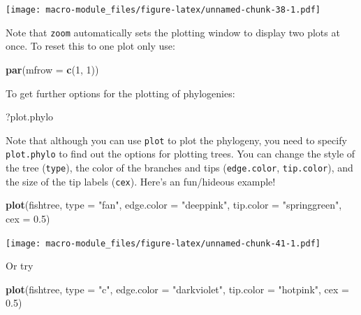 \documentclass[]{book}
\newenvironment{Shaded}{\begin{snugshade}}{\end{snugshade}}
\newcommand{\KeywordTok}[1]{\textcolor[rgb]{0.13,0.29,0.53}{\textbf{{#1}}}}
\newcommand{\DataTypeTok}[1]{\textcolor[rgb]{0.13,0.29,0.53}{{#1}}}
\newcommand{\DecValTok}[1]{\textcolor[rgb]{0.00,0.00,0.81}{{#1}}}
\newcommand{\FloatTok}[1]{\textcolor[rgb]{0.00,0.00,0.81}{{#1}}}
\newcommand{\StringTok}[1]{\textcolor[rgb]{0.31,0.60,0.02}{{#1}}}
\newcommand{\NormalTok}[1]{{#1}}
\theoremstyle{definition}
\theoremstyle{definition}
\theoremstyle{definition}
\theoremstyle{remark}
\begin{document}
\texttt{[image: macro-module\_files/figure-latex/unnamed-chunk-38-1.pdf]}

Note that \texttt{zoom} automatically sets the plotting window to
display two plots at once. To reset this to one plot only use:

\begin{Shaded}
\begin{Highlighting}[]
\KeywordTok{par}\NormalTok{(}\DataTypeTok{mfrow =} \KeywordTok{c}\NormalTok{(}\DecValTok{1}\NormalTok{, }\DecValTok{1}\NormalTok{))}
\end{Highlighting}
\end{Shaded}

To get further options for the plotting of phylogenies:

\begin{Shaded}
\begin{Highlighting}[]
\NormalTok{?plot.phylo}
\end{Highlighting}
\end{Shaded}

Note that although you can use \texttt{plot} to plot the phylogeny, you
need to specify \texttt{plot.phylo} to find out the options for plotting
trees. You can change the style of the tree (\texttt{type}), the color
of the branches and tips (\texttt{edge.color}, \texttt{tip.color}), and
the size of the tip labels (\texttt{cex}). Here's an fun/hideous
example!

\begin{Shaded}
\begin{Highlighting}[]
\KeywordTok{plot}\NormalTok{(fishtree, }\DataTypeTok{type =} \StringTok{"fan"}\NormalTok{, }\DataTypeTok{edge.color =} \StringTok{"deeppink"}\NormalTok{, }\DataTypeTok{tip.color =} \StringTok{"springgreen"}\NormalTok{, }
     \DataTypeTok{cex =} \FloatTok{0.5}\NormalTok{)}
\end{Highlighting}
\end{Shaded}

\texttt{[image: macro-module\_files/figure-latex/unnamed-chunk-41-1.pdf]}

Or try

\begin{Shaded}
\begin{Highlighting}[]
\KeywordTok{plot}\NormalTok{(fishtree, }\DataTypeTok{type =} \StringTok{"c"}\NormalTok{, }\DataTypeTok{edge.color =} \StringTok{"darkviolet"}\NormalTok{, }\DataTypeTok{tip.color =} \StringTok{"hotpink"}\NormalTok{, }
     \DataTypeTok{cex =} \FloatTok{0.5}\NormalTok{)}
\end{Highlighting}
\end{Shaded}
\end{document}
